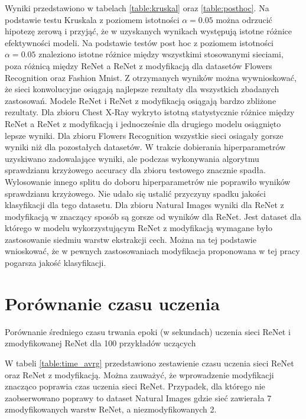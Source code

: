 \documentclass[oneside, mag]{mgr}
\begin{document}
Wyniki przedstawiono w tabelach \ref{table:kruskal} oraz \ref{table:posthoc}. Na podstawie testu Kruskala z poziomem istotności $\alpha = 0.05$ można odrzucić hipotezę zerową i przyjąć, że w uzyskanych wynikach występują istotne różnice efektywności modeli. Na podstawie testów post hoc z poziomem istotności $\alpha = 0.05$ znaleziono istotne różnice między wszystkimi stosowanymi sieciami, poza różnicą między ReNet a ReNet z modyfikacją dla datasetów Flowers Recognition oraz Fashion Mnist. Z otrzymanych wyników można wywnioskować, że sieci konwolucyjne osiągają najlepsze rezultaty dla wszystkich zbadanych zastosowań. Modele ReNet i ReNet z modyfikacją osiągają bardzo zbliżone rezultaty. Dla zbioru Chest X-Ray wykryto istotną statystycznie różnice między ReNet a ReNet z modyfikacją i jednocześnie dla drugiego modelu osiągnięto lepsze wyniki. Dla zbioru Flowers Recognition wszystkie sieci osiagały gorsze wyniki niż dla pozostałych datasetów. W trakcie dobierania hiperparametrów uzyskiwano zadowalające wyniki, ale podczas wykonywania algorytmu sprawdzianu krzyżowego accuracy dla zbioru testowego znacznie spadła. Wylosowanie innego splitu do doboru hiperparametrów nie poprawiło wyników sprawdzianu krzyżowego. Nie udało się ustalić przyczyny spadku jakości klasyfikacji dla tego datasetu. Dla zbioru Natural Images wyniki dla ReNet z modyfikacją w znaczący sposób są gorsze od wyników dla ReNet. Jest dataset dla którego w modelu wykorzystującym ReNet z modyfikacją wymagane było zastosowanie siedmiu warstw ekstrakcji cech. Można na tej podstawie wnioskować, że w pewnych zastosowaniach modyfikacja proponowana w tej pracy pogarsza jakość klasyfikacji.

\section{Porównanie czasu uczenia}

\begin{table}[ht]
    \centering
    \caption{Porównanie średniego czasu trwania epoki (w sekundach) uczenia sieci ReNet i zmodyfikowanej ReNet dla 100 przykładów uczących}
    
    \label{table:time_avrg}
\end{table}

W tabeli \ref{table:time_avrg} przedstawiono zestawienie czasu uczenia sieci ReNet oraz ReNet z modyfikacją. Można zauważyć, że wprowadzenie modyfikacji znacząco poprawia czas uczenia sieci ReNet. Przypadek, dla którego nie zaobserwowano poprawy to dataset Natural Images gdzie sieć zawierała 7 zmodyfikowanych warstw ReNet, a niezmodyfikowanych 2.
\end{document}
